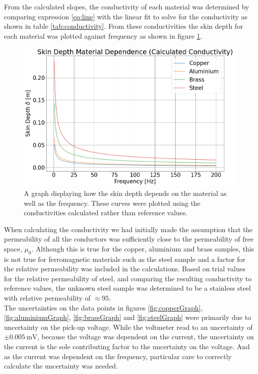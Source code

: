 \documentclass[a4paper,12pt,twocolumn]{article}
\let\cite=\supercite
\begin{document}
	From the calculated slopes, the conductivity of each material was determined by comparing expression \ref{eq:line} with the linear fit to solve for the conductivity as shown in table \ref{tab:conductivity}. From these conductivities the skin depth for each material was plotted against frequency as shown in figure \ref{fig:skinDepth}.\\
	
	\begin{figure}
		\centering
		\includegraphics[width=\columnwidth]{skinDepthMaterialDependence.png}
		\captionsetup{font=scriptsize}
		\caption{A graph displaying how the skin depth depends on the material as well as the frequency. These curves were plotted using the conductivities calculated rather than reference values.}
		\label{fig:skinDepth}
	\end{figure}	
	
	When calculating the conductivity we had initially made the assumption that the permeability of all the conductors was sufficiently close to the permeability of free space, $\mu_0$. Although this is true for the copper, aluminium and brass samples, this is not true for ferromagnetic materials such as the steel sample and a factor for the relative permeability was included in the calculations. Based on trial values for the relative permeability of steel, and comparing the resulting conductivity to reference values, the unknown steel sample was determined to be a stainless steel with relative permeability of $\approx 95$\cite{steel}. \\
	
	The uncertainties on the data points in figures \ref{fig:copperGraph}, \ref{fig:aluminiumGraph}, \ref{fig:brassGraph} and \ref{fig:steelGraph} were primarily due to uncertainty on the pick-up voltage. While the voltmeter read to an uncertainty of $\pm 0.005\,\text{mV}$, because the voltage was dependent on the current, the uncertainty on the current is the sole contributing factor to the uncertainty on the voltage. And as the current was dependent on the frequency, particular care to correctly calculate the uncertainty was needed.\\
	
\end{document}
